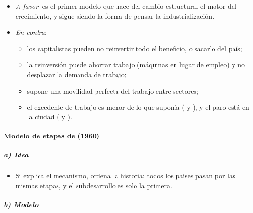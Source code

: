 \documentclass[11pt]{article}
\begin{document}
\begin{itemize}
\item \emph{A favor}: es el primer modelo que hace del cambio estructural el motor del crecimiento, y sigue siendo la forma de pensar la industrialización.
\item \emph{En contra}:
  \begin{itemize}
  \item los capitalistas pueden no reinvertir todo el beneficio, o sacarlo del país;
  \item la reinversión puede ahorrar trabajo (máquinas en lugar de empleo) y no desplazar la demanda de trabajo;
  \item supone una movilidad perfecta del trabajo entre sectores;
  \item el excedente de trabajo es menor de lo que suponía ( y ), y el paro está en la ciudad ( y ).
  \end{itemize}
\end{itemize}

\paragraph{Modelo de etapas de  (1960)}

\subparagraph{a) Idea}

\begin{itemize}
\item Si  explica el mecanismo, \textcite{Rostow1960} ordena la historia: todos los países pasan por las mismas etapas, y el subdesarrollo es solo la primera.
\end{itemize}

\subparagraph{b) Modelo}
\end{document}
